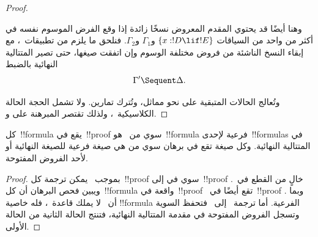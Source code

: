 \documentclass[../../../include/open-logic-section]{subfiles}
\begin{document}
\begin{proof}
\begin{enumerate}
  وهنا أيضًا قد يحتوي المقدم المعروض نسخًا زائدة إذا وقع الفرض الموسوم
  نفسه في أكثر من واحد من السياقات
  $\{x:!D \lif !E\}$ و$\Gamma_1$ و$\Gamma_2$. فنلحق ما يلزم من
  تطبيقات~\LeftR{\Contraction}، مع إبقاء النسخ الناشئة من فروض مختلفة
  الوسوم وإن اتفقت صيغها، حتى تصير المتتالية النهائية بالضبط
  \[
  \Gamma' \Sequent \Delta.
  \]

\end{enumerate}
وتُعالج الحالات المتبقية على نحو مماثل، وتُترك تمارين.
ولا تشمل الحجة الحالة الكلاسيكية~\FalseCl، ولذلك تقتصر المبرهنة على
 و.
\end{proof}

\begin{cor}
كل~!!{formula} يقع في~!!{proof} سوي من~ هو~!!{formula} فرعية
لإحدى~!!{formula}s في المتتالية النهائية. وكل صيغة تقع في برهان سوي من
 هي صيغة فرعية للصيغة النهائية أو لأحد الفروض المفتوحة.
\end{cor}

\begin{proof}
  بموجب~ يمكن ترجمة كل~!!{proof} سوي في
   إلى~!!{proof} خالٍ من القطع في~. ويبين فحص البرهان أن
  كل~!!{formula} واقعة في~!!{proof}~ تقع أيضًا في~!!{proof}
  . وبما أن~ لا يملك قاعدة~\Cut{}، فله خاصية
  !!{formula} الفرعية. أما ترجمة~ إلى~ فتحفظ السوية
  وتسجل الفروض المفتوحة في مقدمة المتتالية النهائية، فتنتج الحالة الثانية
  من الحالة الأولى.
\end{proof}
\end{document}
